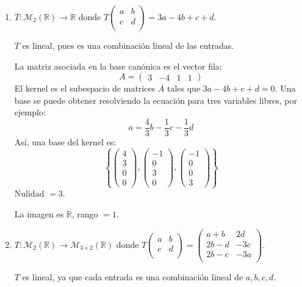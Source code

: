 \begin{prob}
\begin{enumerate}[$a)$]
\item $T:\mathcal{M}_{2}\left(\mathbb{R}\right) \rightarrow \mathbb{R}$ donde $T\left( \begin{array}{cc} 
	a&b \\
	c&d\\
	\end{array} \right)= 3a-4b+c+d.$
\begin{myproof}
$T$ es lineal, pues es una combinación lineal de las entradas.

La matriz asociada en la base canónica es el vector fila:
\[
A = \begin{pmatrix} 3 & -4 & 1 & 1 \end{pmatrix}
\]
El kernel es el subespacio de matrices $A$ tales que $3a-4b+c+d=0$. Una base se puede obtener resolviendo la ecuación para tres variables libres, por ejemplo:
\[
a = \frac{4}{3}b - \frac{1}{3}c - \frac{1}{3}d
\]
Así, una base del kernel es:
\[
\left\{
\begin{pmatrix}4\\3\\0\\0\end{pmatrix},
\begin{pmatrix}-1\\0\\3\\0\end{pmatrix},
\begin{pmatrix}-1\\0\\0\\3\end{pmatrix}
\right\}
\]
Nulidad $=3$.

La imagen es $\mathbb{R}$, rango $=1$.
\end{myproof}

\item $T:\mathcal{M}_{2}\left(\mathbb{R}\right) \rightarrow \mathcal{M}_{3\times 2}\left(\mathbb{R}\right)$ donde $T\left( \begin{array}{cc} 
	a&b \\
	c&d\\
	\end{array} \right)= \left( \begin{array}{cc} 
	a+b& 2d \\
	2b-d&-3c\\
	2b-c&-3a\\
	\end{array} \right).$
\begin{myproof}
$T$ es lineal, ya que cada entrada es una combinación lineal de $a, b, c, d$.


\end{myproof}
\end{enumerate}
\end{prob}
